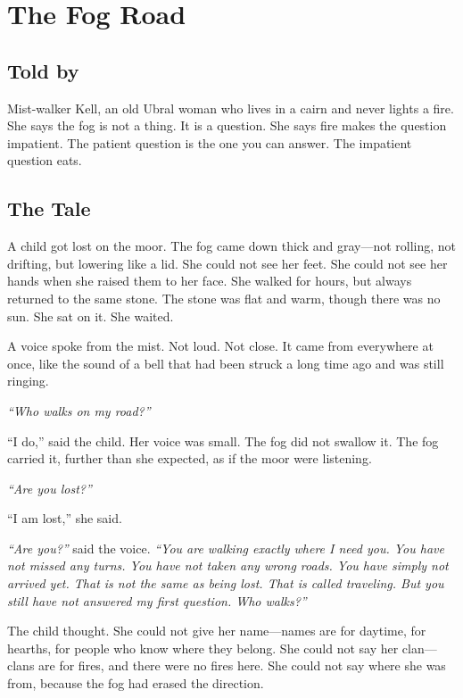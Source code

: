 \chapter{The Fog Road}

\section*{Told by}
Mist-walker Kell, an old Ubral woman who lives in a cairn and never lights a fire. She says the fog is not a thing. It is a question. She says fire makes the question impatient. The patient question is the one you can answer. The impatient question eats.

\section*{The Tale}

A child got lost on the moor. The fog came down thick and gray---not rolling, not drifting, but lowering like a lid. She could not see her feet. She could not see her hands when she raised them to her face. She walked for hours, but always returned to the same stone. The stone was flat and warm, though there was no sun. She sat on it. She waited.

A voice spoke from the mist. Not loud. Not close. It came from everywhere at once, like the sound of a bell that had been struck a long time ago and was still ringing.

\textit{``Who walks on my road?''}

``I do,'' said the child. Her voice was small. The fog did not swallow it. The fog carried it, further than she expected, as if the moor were listening.

\textit{``Are you lost?''}

``I am lost,'' she said.

\textit{``Are you?''} said the voice. \textit{``You are walking exactly where I need you. You have not missed any turns. You have not taken any wrong roads. You have simply not arrived yet. That is not the same as being lost. That is called traveling. But you still have not answered my first question. Who walks?''}

The child thought. She could not give her name---names are for daytime, for hearths, for people who know where they belong. She could not say her clan---clans are for fires, and there were no fires here. She could not say where she was from, because the fog had erased the direction.

